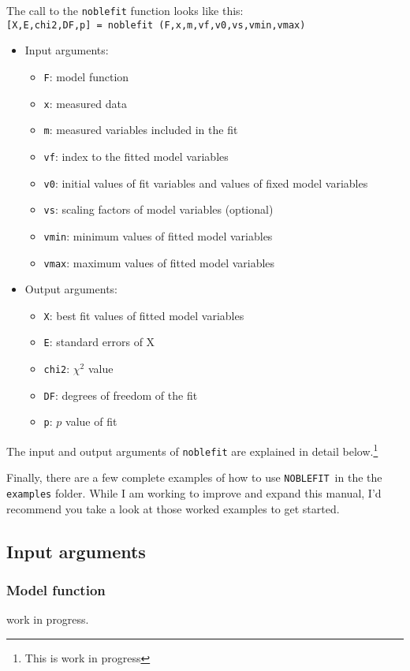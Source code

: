 \documentclass[12pt]{article}
\newcommand{\noblefit}{{\tt NOBLEFIT}}
\begin{document}
The call to the {\tt noblefit} function looks like this:\\
{\tt [X,E,chi2,DF,p] = noblefit (F,x,m,vf,v0,vs,vmin,vmax)}
\begin{itemize}
\item Input arguments:
\begin{itemize}
	\item {\tt F}: model function
	\item {\tt x}: measured data
	\item {\tt m}: measured variables included in the fit
	\item {\tt vf}: index to the fitted model variables
	\item {\tt v0}: initial values of fit variables and values of fixed model variables
	\item {\tt vs}: scaling factors of model variables (optional)
	\item {\tt vmin}: minimum values of fitted model variables
	\item {\tt vmax}: maximum values of fitted model variables
\end{itemize}
\item Output arguments:
\begin{itemize}
	\item {\tt X}: best fit values of fitted model variables
	\item {\tt E}: standard errors of X
	\item {\tt chi2}: $\chi^2$ value
	\item {\tt DF}: degrees of freedom of the fit
	\item {\tt p}: $p$ value of fit
\end{itemize}
\end{itemize}
\par

The input and output arguments of {\tt noblefit} are explained in detail below.\footnote{This is work in progress}

Finally, there are a few complete examples of how to use \noblefit\ in the the {\tt examples} folder. While I am working to improve and expand this manual, I'd recommend you take a look at those worked examples to get started.

\subsection{Input arguments}
\subsubsection{Model function}
work in progress.
\end{document}
